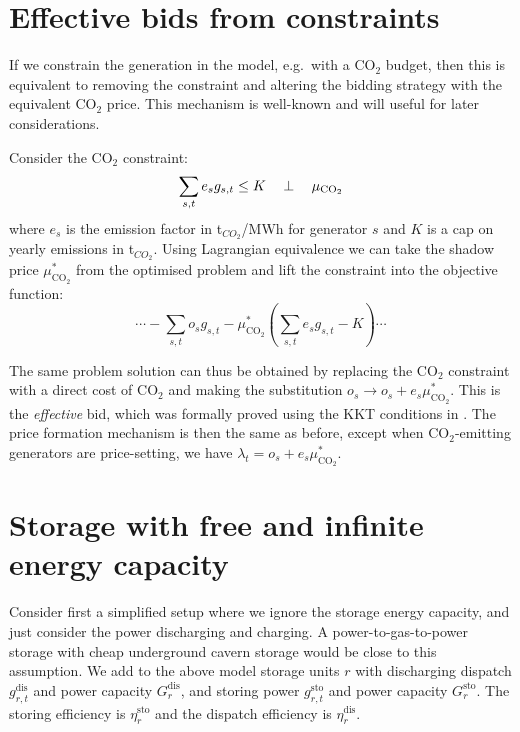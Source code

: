 \documentclass[final,3p]{elsarticle}
\def\l{\lambda} \def\K{\kappa} \def\m{\mu} \def\G{\Gamma} \def\d{\partial}
\begin{document}
\section*{Effective bids from constraints}\label{sec:effective}

If we constrain the generation in the model, e.g.~with a CO$_2$ budget, then
this is equivalent to removing the constraint and altering the bidding strategy
with the equivalent CO$_2$ price. This mechanism is well-known and will useful
for later considerations.

Consider the CO$_2$ constraint:
\begin{equation}
  \sum_{s,t} e_s g_{s,t} \leq K \hspace{0.34cm}\perp \hspace{0.34cm} \mu_{\textrm{CO}_2} \label{eq:co2}
\end{equation}
where $e_s$ is the emission factor in t$_{CO_2}$/MWh\el{} for generator
$s$ and $K$ is a cap on yearly emissions in t$_{CO_2}$.
Using Lagrangian equivalence we can take the shadow price
$\mu^*_{\textrm{CO}_2}$ from the optimised problem and lift the constraint into the
objective function:
\begin{equation}
  \cdots -\sum_{s,t} o_s g_{s,t}   - \mu^*_{\textrm{CO}_2} \left(\sum_{s,t} e_s g_{s,t} - K \right) \cdots
\end{equation}

The same problem solution can thus be obtained by replacing the CO$_2$
constraint with a direct cost of CO$_2$ and making the substitution $o_s \to o_s
+ e_s \mu^*_{\textrm{CO}_2}$. This is the \textit{effective} bid, which was
formally proved using the KKT conditions in \cite{Brown2020}. The price
formation mechanism is then the same as before, except when CO$_2$-emitting
generators are price-setting, we have $\l_t = o_s + e_s \mu^*_{\textrm{CO}_2}$.

\section*{Storage with free and infinite energy capacity}\label{sec:simple}

Consider first a simplified setup where we ignore the storage energy capacity,
and just consider the power discharging and charging. A power-to-gas-to-power
storage with cheap underground cavern storage would be close to this assumption.
We add to the above model storage units $r$ with discharging dispatch
$g^{\textrm{dis}}_{r,t}$ and power capacity $G^{\textrm{dis}}_{r}$, and storing
power $g^{\textrm{sto}}_{r,t}$ and power capacity $G^{\textrm{sto}}_{r}$. The
storing efficiency is $\eta_r^{\textrm{sto}}$ and the dispatch efficiency is
$\eta_r^{\textrm{dis}}$.
\end{document}
